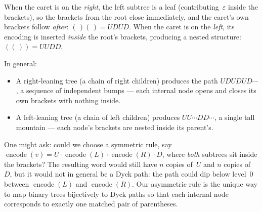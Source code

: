 \documentclass[11pt]{article}
\newcommand{\encode}{\operatorname{encode}}
\begin{document}
\begin{center}
\end{center}

\noindent When the caret is on the \emph{right}, the left subtree is a leaf (contributing~$\varepsilon$ inside the brackets), so the brackets from the root close immediately, and the caret's own brackets follow \emph{after}: $(\,)(\,) = UDUD$.  When the caret is on the \emph{left}, its encoding is inserted \emph{inside} the root's brackets, producing a nested structure: $((\,)) = UUDD$.

In general:
\begin{itemize}
\item A right-leaning tree (a chain of right children) produces the path $UDUDUD\cdots$, a sequence of independent bumps --- each internal node opens and closes its own brackets with nothing inside.
\item A left-leaning tree (a chain of left children) produces $UU\cdots DD\cdots$, a single tall mountain --- each node's brackets are nested inside its parent's.
\end{itemize}

One might ask: could we choose a symmetric rule, say $\encode(v) = U \cdot \encode(L) \cdot \encode(R) \cdot D$, where \emph{both} subtrees sit inside the brackets?  The resulting word would still have $n$ copies of~$U$ and $n$ copies of~$D$, but it would not in general be a Dyck path: the path could dip below level~$0$ between $\encode(L)$ and $\encode(R)$.  Our asymmetric rule is the unique way to map binary trees bijectively to Dyck paths so that each internal node corresponds to exactly one matched pair of parentheses.
\end{document}

